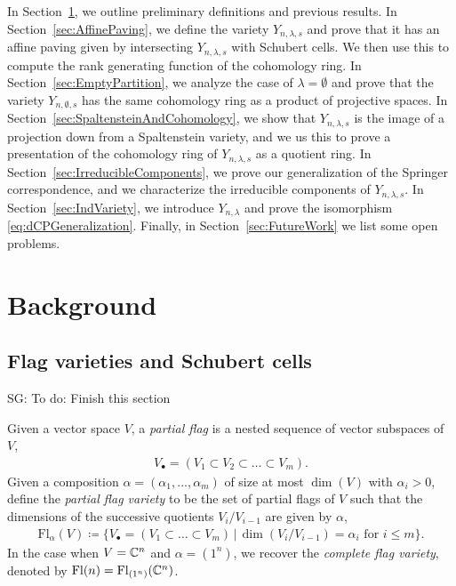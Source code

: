 \documentclass[12pt]{amsart}
\newcommand{\st}{\,|\,}
\newcommand{\Fl}{\mathrm{Fl}}
\newcommand{\la}{\lambda}
\newcommand{\SG}[1]{{\color{red} SG: #1}}
\begin{document}
In Section~\ref{sec:Background}, we outline preliminary definitions and previous results. In Section~\ref{sec:AffinePaving}, we define the variety $Y_{n,\lambda,s}$ and prove that it has an affine paving given by intersecting $Y_{n,\lambda,s}$ with Schubert cells. We then use this to compute the rank generating function of the cohomology ring.
In Section~\ref{sec:EmptyPartition}, we analyze the case of $\lambda=\emptyset$ and prove that the variety $Y_{n,\emptyset,s}$ has the same cohomology ring as a product of projective spaces.
In Section~\ref{sec:SpaltensteinAndCohomology}, we show that $Y_{n,\la,s}$ is the image of a projection down from a Spaltenstein variety, and we us this to prove a presentation of the cohomology ring of $Y_{n,\lambda,s}$ as a quotient ring.
In Section~\ref{sec:IrreducibleComponents}, we prove our generalization of the Springer correspondence, and we characterize the irreducible components of $Y_{n,\la,s}$.
In Section~\ref{sec:IndVariety}, we introduce $Y_{n,\la}$ and prove the isomorphism \eqref{eq:dCPGeneralization}.
Finally, in Section~\ref{sec:FutureWork} we list some open problems.






\section{Background}\label{sec:Background}


\subsection{Flag varieties and Schubert cells}


\SG{To do: Finish this section}

Given a vector space $V$, a \emph{partial flag} is a nested sequence of vector subspaces of $V$,
\begin{align}
    V_\bullet = (V_1\subset V_2\subset\dots\subset V_m).
\end{align}
Given a composition $\alpha = (\alpha_1,\dots, \alpha_m)$ of size at most $\dim(V)$ with $\alpha_i>0$,  define the \emph{partial flag variety} to be the set of partial flags of $V$ such that the dimensions of the successive quotients $V_i/V_{i-1}$ are given by $\alpha$,
\begin{align}
    \Fl_{\alpha}(V) \coloneqq \{V_\bullet = (V_1\subset\dots\subset V_m) \st  \dim(V_i/V_{i-1}) = \alpha_i\text{ for }i\leq m\}.
\end{align}
In the case when $V = \mathbb{C}^n$ and $\alpha = (1^n)$, we recover the \emph{complete flag variety}, denoted by $\Fl(n) = \Fl_{(1^n)}(\bC^n)$.
\end{document}
